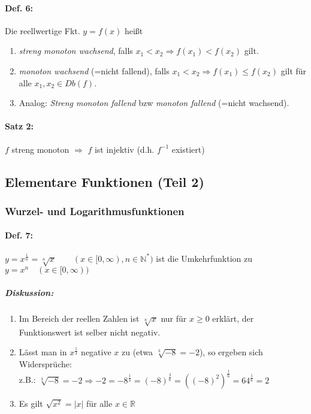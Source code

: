 \paragraph{Def. 6:} \parskp
Die reellwertige Fkt. $y=f(x)$ heißt
\begin{enumerate}[label=\alph*.)]
\item \emph{streng monoton wachsend}, falls $x_1<x_2 \Rightarrow f(x_1)<f(x_2)$ gilt.
\item \emph{monoton wachsend} (=nicht fallend), falls $x_1<x_2 \Rightarrow f(x_1) \leq f(x_2)$ gilt für alle $x_1, x_2 \in Db(f)$.
\item Analog: \emph{Streng monoton fallend} bzw \emph{monoton fallend} (=nicht wachsend).
\end{enumerate}

\paragraph{Satz 2:} \parskp
$f$ streng monoton $\Rightarrow$ $f$ ist injektiv (d.h. $f^{-1}$ existiert)

\subsection{Elementare Funktionen (Teil 2)}
\subsubsection{Wurzel- und Logarithmusfunktionen}\label{1.4.3}
\paragraph{Def. 7:} \parskp
$y=x^{\frac{1}{n}}=\sqrt[n]{x} \qquad (x\in [0,\infty), n \in \mathbb{N}^*)$ ist die Umkehrfunktion zu $y=x^n \quad (x \in [0, \infty))$

\subparagraph{Diskussion: }
\begin{enumerate}
\item Im Bereich der reellen Zahlen ist $\sqrt[n]{x}$ nur für $x\geq 0 $ erklärt, der Funktionswert ist selber nicht negativ.
\item Lässt man in $x^{\frac{1}{3}}$ negative $x$ zu (etwa $\sqrt[3]{-8}=-2$), so ergeben sich Widersprüche:\\
z.B.: $\sqrt[3]{-8}=-2 \Rightarrow -2=-8^{\frac{1}{3}}=(-8)^{\frac{2}{6}}=\left((-8)^2\right)^{\frac{1}{6}}=64^{\frac{1}{6}}=2$
\item Es gilt $\sqrt{x^2}=|x|$ für alle $x \in \mathbb{R}$
\end{enumerate}

